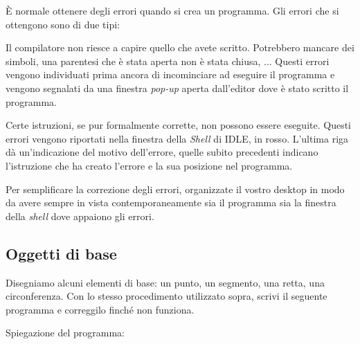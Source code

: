 \begin{osservazione}

 È normale ottenere degli errori quando si crea un programma. Gli errori che si 
ottengono sono di due tipi:
\begin{description} [noitemsep]
 \item [Sintattici]
 Il compilatore non riesce a capire quello che avete scritto. Potrebbero 
mancare dei simboli, una parentesi che è stata aperta non è stata chiusa, ...
Questi errori vengono individuati prima ancora di incominciare ad eseguire il 
programma e vengono segnalati da una finestra \emph{pop-up} aperta 
dall'editor dove è stato scritto il programma.
 \item [Semantici]
 Certe istruzioni, se pur formalmente corrette, non possono essere eseguite.
 Questi errori vengono riportati nella finestra della \emph{Shell} di IDLE, in 
rosso.
L'ultima riga dà un'indicazione del motivo dell'errore, quelle subito 
precedenti indicano l'istruzione che ha creato l'errore e la sua posizione nel 
programma.
\end{description}

Per semplificare la correzione degli errori, organizzate il vostro desktop in 
modo da avere sempre in vista contemporaneamente sia il programma sia la 
finestra della \emph{shell} dove appaiono gli errori.

\end{osservazione}


\subsection{Oggetti di base}
\label{subsec:geo_int_oggetti_base}
Disegniamo alcuni elementi di base: un punto, un segmento, una retta, una 
circonferenza.
Con lo stesso procedimento utilizzato sopra, scrivi il seguente programma e 
correggilo finché non funziona.



Spiegazione del programma:

